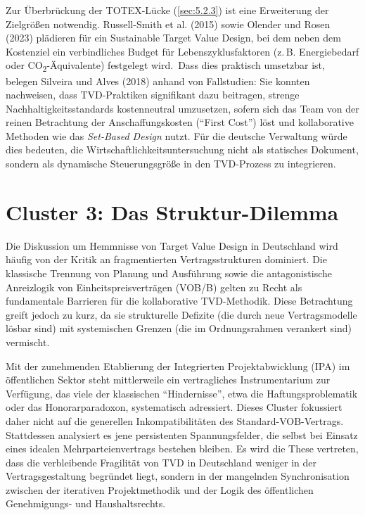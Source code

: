 Zur Überbrückung der \acs{TOTEX}-Lücke (\cref{sec:5.2.3}) ist eine Erweiterung der Zielgrößen notwendig. Russell-Smith et al. (2015) sowie Olender und Rosen (2023) plädieren für ein Sustainable Target Value Design, bei dem neben dem Kostenziel ein verbindliches Budget für Lebenszyklusfaktoren (z.\,B. Energiebedarf oder CO\textsubscript{2}-Äquivalente) festgelegt wird.\autocite[Vgl.][S.~29]{olender_target_2023}\,\autocite[Vgl.][S.~45]{russell-smith_sustainable_2015}
Dass dies praktisch umsetzbar ist, belegen Silveira und Alves (2018) anhand von Fallstudien: Sie konnten nachweisen, dass \acs{TVD}-Praktiken signifikant dazu beitragen, strenge Nachhaltigkeitsstandards kostenneutral umzusetzen, sofern sich das Team von der reinen Betrachtung der Anschaffungskosten (\enquote{First Cost}) löst und kollaborative Methoden wie das \textit{Set-Based Design} nutzt.\autocite[Vgl.][S.~17 f]{silveira_target_2018}
Für die deutsche Verwaltung würde dies bedeuten, die Wirtschaftlichkeitsuntersuchung nicht als statisches Dokument, sondern als dynamische Steuerungsgröße in den \acs{TVD}-Prozess zu integrieren.

\clearpage

\section{Cluster 3: Das Struktur-Dilemma}
\label{sec:5.3}

Die Diskussion um Hemmnisse von Target Value Design in Deutschland wird häufig von der Kritik an fragmentierten Vertragsstrukturen dominiert. Die klassische Trennung von Planung und Ausführung sowie die antagonistische Anreizlogik von Einheitspreisverträgen (\acs{VOB}/B) gelten zu Recht als fundamentale Barrieren für die kollaborative \acs{TVD}-Methodik.
Diese Betrachtung greift jedoch zu kurz, da sie strukturelle Defizite (die durch neue Vertragsmodelle lösbar sind) mit systemischen Grenzen (die im Ordnungsrahmen verankert sind) vermischt.

Mit der zunehmenden Etablierung der Integrierten Projektabwicklung (\acs{IPA}) im öffentlichen Sektor steht mittlerweile ein vertragliches Instrumentarium zur Verfügung, das viele der klassischen \enquote{Hindernisse}, etwa die Haftungsproblematik oder das Honorarparadoxon, systematisch adressiert. Dieses Cluster fokussiert daher nicht auf die generellen Inkompatibilitäten des Standard-\acs{VOB}-Vertrags. Stattdessen analysiert es jene persistenten Spannungsfelder, die selbst bei Einsatz eines idealen Mehrparteienvertrags bestehen bleiben.
Es wird die These vertreten, dass die verbleibende Fragilität von \acs{TVD} in Deutschland weniger in der Vertragsgestaltung begründet liegt, sondern in der mangelnden Synchronisation zwischen der iterativen Projektmethodik und der Logik des öffentlichen Genehmigungs- und Haushaltsrechts.

